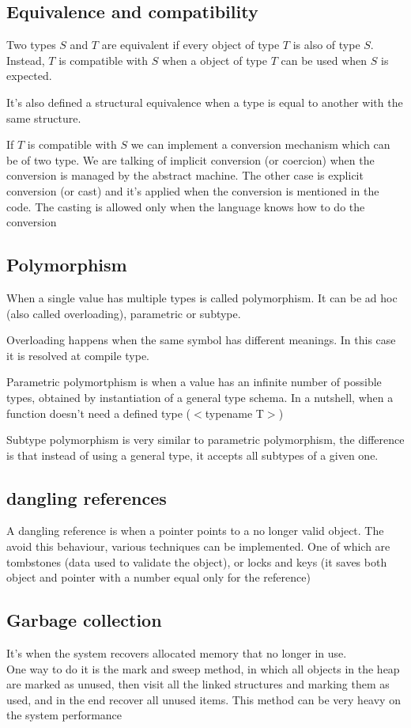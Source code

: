 \documentclass[12pt, a4paper]{article}
\begin{document}
\subsection{Equivalence and compatibility}
Two types $S$ and $T$ are equivalent if every object of type $T$ is also of type $S$. Instead, $T$ is compatible
with $S$ when a object of type $T$ can be used when $S$ is expected.

It's also defined a structural equivalence when a type is equal to another with the same structure.

If $T$ is compatible with $S$ we can implement a conversion mechanism which can be of two type. We are talking of 
implicit conversion  (or coercion) when the conversion is managed by the abstract machine. The other case is explicit
conversion (or cast) and it's applied when the conversion is mentioned in the code. The casting is allowed only when
the language knows how to do the conversion

\subsection{Polymorphism}
When a single value has multiple types is called polymorphism. It can be ad hoc (also called overloading), parametric 
or subtype.

Overloading happens when the same symbol has different meanings. In this case it is resolved at compile type.

Parametric polymortphism is when a value has an infinite number of possible types, obtained by instantiation of a 
general type schema. In a nutshell, when a function doesn't need a defined type ($<$typename T$>$)

Subtype polymorphism is very similar to parametric polymorphism, the difference is that instead of using a general
type, it accepts all subtypes of a given one.

\subsection{dangling references}
A dangling reference is when a pointer points to a no longer valid object. The avoid this behaviour, various
techniques can be implemented. One of which are tombstones (data used to validate the object), or locks and keys (it 
saves both object and pointer with a number equal only for the reference) 

\subsection{Garbage collection}
It's when the system recovers allocated memory that no longer in use.\\ One way to do it is the mark and sweep method,
in which all objects in the heap are marked as unused, then visit all the linked structures and marking them as used,
and in the end recover all unused items. This method can be very heavy on the system performance
\end{document}
